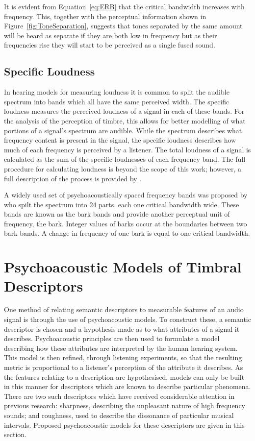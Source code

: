 		It is evident from Equation~\ref{eq:ERB} that the critical bandwidth increases with frequency. This,
		together with the perceptual information shown in Figure~\ref{fig:ToneSeparation}, suggests that tones
		separated by the same amount will be heard as separate if they are both low in frequency but as their
		frequencies rise they will start to be perceived as a single fused sound.

	\subsection{Specific Loudness}
	\label{sec:Timbre-PsychoacousticPrinciples-SpecificLoudness}
		In hearing models for measuring loudness it is common to split the audible spectrum into bands which all
		have the same perceived width. The specific loudness measures the perceived loudness of a signal in each of
		these bands. For the analysis of the perception of timbre, this allows for better modelling of what
		portions of a signal's spectrum are audible. While the spectrum describes what frequency content is present
		in the signal, the specific loudness describes how much of each frequency is perceived by a listener.  The
		total loudness of a signal is calculated as the sum of the specific loudnesses of each frequency band. The
		full procedure for calculating loudness is beyond the scope of this work; however, a full description of
		the process is provided by \citet{moore1997a}.

		A widely used set of psychoacoustically spaced frequency bands was proposed by
		\citet{zwicker1961subdivision} who spilt the spectrum into 24 parts, each one critical bandwidth wide.
		These bands are known as the bark bands and provide another perceptual unit of frequency, the bark. Integer
		values of barks occur at the boundaries between two bark bands. A change in frequency of one bark is equal
		to one critical bandwidth.

\section{Psychoacoustic Models of Timbral Descriptors}
\label{sec:Timbre-TimbralFeatures}
	One method of relating semantic descriptors to measurable features of an audio signal is through the use of
	psychoacoustic models. To construct these, a semantic descriptor is chosen and a hypothesis made as to what
	attributes of a signal it describes. Psychoacoustic principles are then used to formulate a model describing how
	these attributes are interpreted by the human hearing system. This model is then refined, through listening
	experiments, so that the resulting metric is proportional to a listener's perception of the attribute it describes.
	As the features relating to a description are hypothesised, models can only be built in this manner for descriptors
	which are known to describe particular phenomena. There are two such descriptors which have received considerable
	attention in previous research: sharpness, describing the unpleasant nature of high frequency sounds; and
	roughness, used to describe the dissonance of particular musical intervals. Proposed psychoacoustic models for
	these descriptors are given in this section.
	
